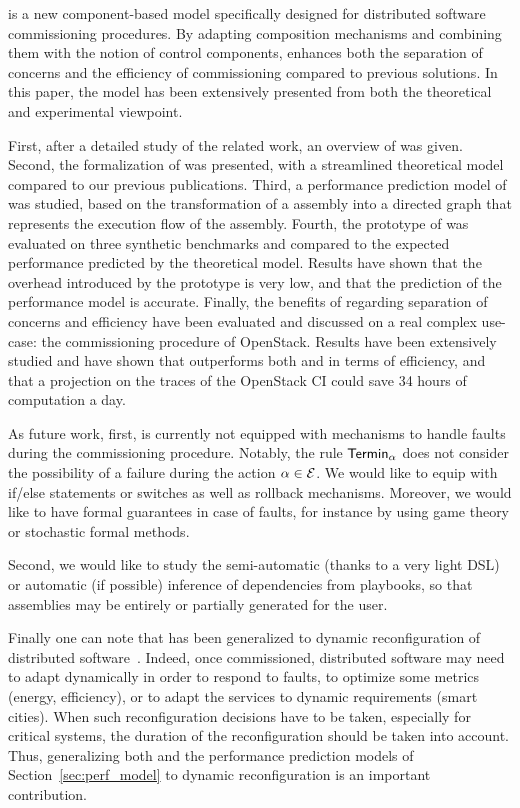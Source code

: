 \mad is a new component-based model specifically designed for distributed software commissioning procedures. By adapting composition mechanisms and combining them with the notion of control components, \mad enhances both the separation of concerns and the efficiency of commissioning compared to previous solutions. In this paper, the \mad model has been extensively presented from both the theoretical and experimental viewpoint.

First, after a detailed study of the related work, an overview of \mad
was given. Second, the formalization of \mad was presented, with a
streamlined theoretical model compared to our previous
publications. Third, a performance prediction model of \mad was
studied, based on the transformation of a \mad assembly into a
directed graph that represents the execution flow of the
assembly. Fourth, the prototype of \mad was evaluated on three
synthetic benchmarks and compared to the expected performance
predicted by the theoretical model. Results have shown that the
overhead introduced by the prototype is very low, and that the prediction
of the performance model is accurate. Finally, the benefits of \mad regarding
separation of concerns and efficiency have been evaluated and
discussed on a real complex use-case: the commissioning procedure of
OpenStack. Results have been extensively studied and have shown that
\mad outperforms both \ansible and \aeolus in terms of efficiency, and that a 
projection on the traces of the OpenStack CI could save 34 hours of computation a 
day.

As future work, first, \mad is currently not equipped with mechanisms to handle faults during the commissioning procedure. Notably, the rule $\mathsf{Termin}_\alpha$
does not consider the possibility of a failure during the action
$\alpha \in \mathcal{E}$. We would like to equip \mad with if/else statements or switches as well as rollback mechanisms. Moreover, we would like to have formal guarantees in case of faults, for instance by using game theory or stochastic formal methods.

Second, we would like to study the semi-automatic (thanks to a very light DSL) or automatic (if possible) inference of dependencies from \ansible playbooks, so that \mad assemblies may be entirely or partially generated for the user.

Finally one can note that \mad has been generalized to dynamic reconfiguration of distributed software~\cite{ccgridmaverick}. Indeed, once commissioned, distributed software may need to adapt dynamically in order to respond to faults, to optimize some metrics (\eg energy, efficiency), or to adapt the services to dynamic requirements (\eg smart cities). When such reconfiguration decisions have to be taken, especially for critical systems, the duration of the reconfiguration should be taken into account. Thus, generalizing both \mad and the performance prediction models of Section~\ref{sec:perf_model} to dynamic reconfiguration is an important contribution.

  
